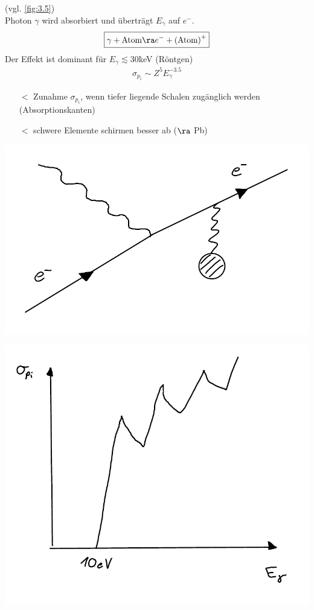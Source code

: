  (vgl. \autoref{fig:3.5})\\
Photon $\gamma$ wird absorbiert und überträgt $E_\gamma$ auf $e^-$.
\begin{align*}
\boxed{ \gamma + \text{Atom} \ra e^- + \left(\text{Atom}\right)^+ }
\end{align*}
Der Effekt ist dominant für $E_\gamma \lesssim 30$\.keV (Röntgen)
\begin{align*}
\sigma_{p_i} \sim Z^5 E_\gamma^{-3.5}
\end{align*}
\begin{itemize}
\item[$\lt$] Zunahme $\sigma_{p_i}$, wenn tiefer liegende Schalen \glqq zugänglich\grqq{} werden (Absorptionskanten)
\item[$\lt$] schwere Elemente schirmen  besser ab ($\ra$ Pb)
\end{itemize}
\begin{minipage}[c]{.45\textwidth}
\captionsetup{type=figure}
\includegraphics[width=\textwidth]{imgs/ep5-fig-3-5.pdf}
\end{minipage}
\begin{minipage}[c]{.45\textwidth}
\captionsetup{type=figure}
\includegraphics[width=\textwidth]{imgs/ep5-fig-3-6.pdf}
\end{minipage}

